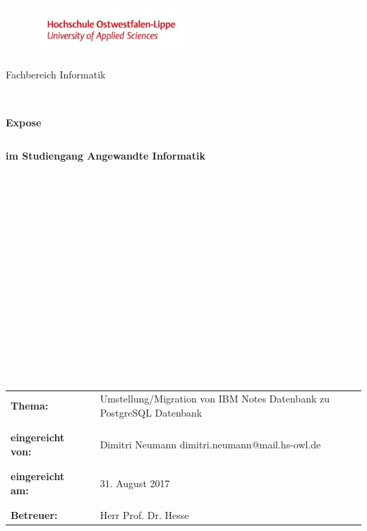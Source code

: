 \documentclass{article}
\begin{document}
\begin{titlepage}
\begin{verbatim}



\end{verbatim}
\begin{figure}[htbp] 
  \centering
     \includegraphics[width=0.5\textwidth]		{FH_Logo.jpg}
\end{figure}
\begin{center}
\Large{Fachbereich Informatik}
\end{center}
\begin{verbatim}


\end{verbatim}
\begin{center}
\textbf{\Large{Expose}}
\end{center}
\begin{verbatim}

\end{verbatim}
\begin{center}
\textbf{im Studiengang Angewandte Informatik}
\end{center}
\begin{verbatim}
















\end{verbatim}
\begin{flushleft}
\begin{tabular}{lll}
\textbf{Thema:} & & Umstellung/Migration von IBM Notes Datenbank zu PostgreSQL Datenbank\\
& & \\
& & \\
\textbf{eingereicht von:} & & Dimitri Neumann \flq{}dimitri.neumann@mail.hs-owl.de\frq{}\\
& & \\
& & \\
\textbf{eingereicht am:} & & 31. August 2017\\
& & \\
& & \\
\textbf{Betreuer:} & & Herr Prof. Dr. Hesse
\end{tabular}
\end{flushleft}
\end{titlepage}
\newpage
\end{document}
